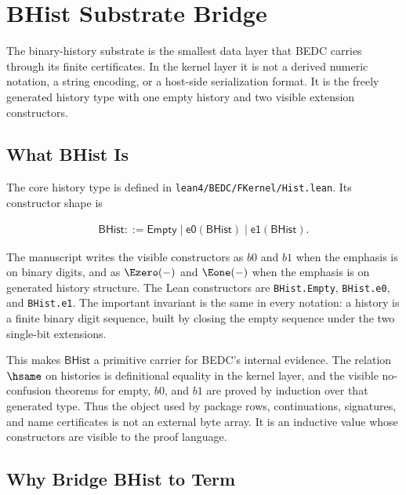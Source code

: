 \section{BHist Substrate Bridge}
\label{sec:self-comp-bhist-substrate-bridge}

The binary-history substrate is the smallest data layer that BEDC carries
through its finite certificates. In the kernel layer it is not a derived
numeric notation, a string encoding, or a host-side serialization format. It
is the freely generated history type with one empty history and two visible
extension constructors.

\subsection{What BHist Is}
\label{subsec:bhist-substrate-what}

The core history type is defined in
\texttt{lean4/BEDC/FKernel/Hist.lean}. Its constructor shape is

$$
\begin{aligned}
\mathsf{BHist}
  ::= \mathsf{Empty}
   \mid \mathsf{e0}(\mathsf{BHist})
   \mid \mathsf{e1}(\mathsf{BHist}) .
\end{aligned}
$$

The manuscript writes the visible constructors as $b0$ and $b1$ when the
emphasis is on binary digits, and as $\Ezero(-)$ and $\Eone(-)$ when the
emphasis is on generated history structure. The Lean constructors are
\texttt{BHist.Empty}, \texttt{BHist.e0}, and \texttt{BHist.e1}. The
important invariant is the same in every notation: a history is a finite
binary digit sequence, built by closing the empty sequence under the two
single-bit extensions.

This makes $\mathsf{BHist}$ a primitive carrier for BEDC's internal evidence.
The relation $\hsame$ on histories is definitional equality in the kernel
layer, and the visible no-confusion theorems for empty, $b0$, and
$b1$ are proved by induction over that generated type. Thus the object used
by package rows, continuations, signatures, and name certificates is not an
external byte array. It is an inductive value whose constructors are visible
to the proof language.

\subsection{Why Bridge BHist to Term}
\label{subsec:bhist-substrate-why-bridge}

